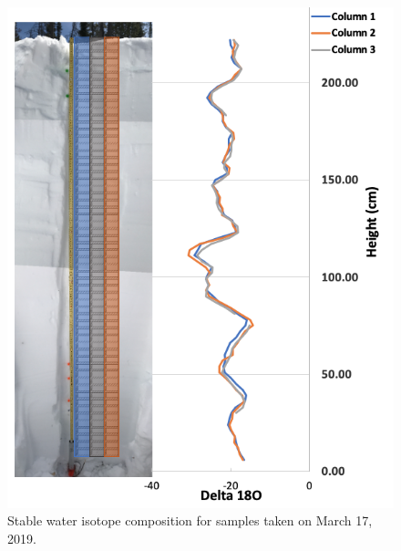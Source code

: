 \begin{figure}[H]
    \centering
    \includegraphics[width=0.7\linewidth]{figures/Isotopes/Mar17_Isotopes.png}
    \caption{Stable water isotope composition for samples taken on March 17, 2019.}
    \label{fig:Mar17_Isotopes}
\end{figure}